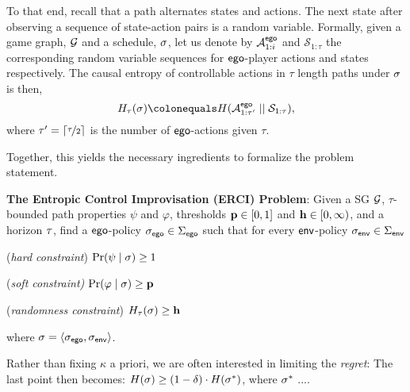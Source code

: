 {{{To that end, recall that a path alternates states and actions.  The
next state after observing a sequence of state-action pairs is a
random variable. Formally, given a game graph, $\mathcal{G}$ and a schedule,
$\sigma$, let us denote by $\mathcal{A}^{\mathsf{ego}}_{1:i}$ and
$\mathcal{S}_{1:\tau}$ the corresponding random variable sequences for
$\mathsf{ego}$-player actions and states respectively.  The causal entropy of
controllable actions in $\tau$ length paths under $\sigma$ is then,
\begin{equation}
   H_\tau(\sigma) \colonequals H( \mathcal{A}^{\pOne}_{1:\tau'} \mid\mid \mathcal{S}_{1:\tau} ),
\end{equation}
where $\tau' = \lceil \nicefrac{\tau}{2}\rceil$ is the number of $\mathsf{ego}$-actions given $\tau$.



\begin{example}
	
\end{example}

Together, this yields the necessary ingredients to formalize the problem statement. 
\begin{mdframed}[backgroundcolor=blue!5]
\textbf{The Entropic Control Improvisation (ERCI) Problem}:
Given a SG $\mathcal{G}$, $\tau$-bounded path properties $\psi$ and $\varphi$, thresholds $\mathbf{p} \in [0,1]$ and $\mathbf{h} \in [0,\infty)$, and a horizon $\tau$,  find a $\mathsf{ego}$-policy ${\sigma_{\mathsf{ego}}} \in \Sigma_{\mathsf{ego}}$  such that for every $\mathsf{env}$-policy ${\sigma_{\mathsf{env}}} \in \Sigma_{\mathsf{env}}$ \begin{compactenum}
	\item (\emph{hard constraint}) $\Pr(\psi \mid \sigma) \geq 1$
	\item (\emph{soft constraint)} $\Pr(\varphi \mid \sigma) \geq \mathbf{p}$
\item (\emph{randomness constraint}) $H_\tau(\sigma) \geq \mathbf{h}$
\end{compactenum}
where  $\sigma = \langle {\sigma_{\mathsf{ego}}}, {\sigma_{\mathsf{env}}} \rangle$.
\end{mdframed}
Rather than fixing $\kappa$ a priori, we are often interested in limiting the \emph{regret}: The last point then becomes:
$H(\sigma) \geq (1-\delta) \cdot H(\sigma^{*})$, where $\sigma^{*}$ ....  


}}}
